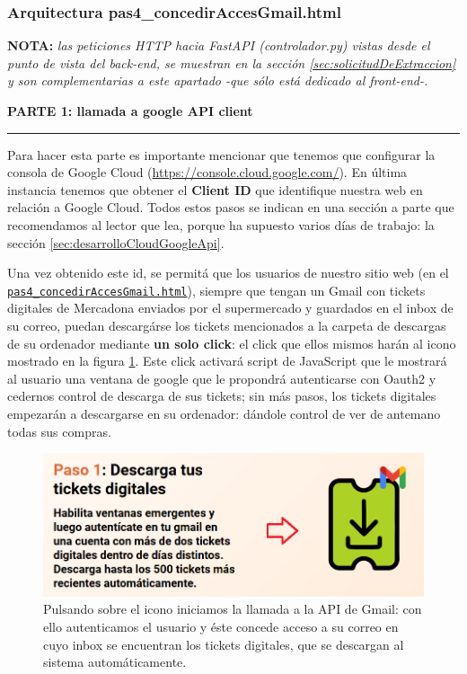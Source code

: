 \documentclass[a4paper,12pt]{report}
\begin{document}
	
	\subsubsection{Arquitectura pas4\_concedirAccesGmail.html}
	\label{sec:pas4googleAPIclient}
	
	
	\textbf{NOTA:} \textit{las peticiones HTTP hacia FastAPI (controlador.py) vistas desde el punto de vista del back-end, se muestran en la sección \ref{sec:solicitudDeExtraccion} y son complementarias a este apartado -que sólo está dedicado al front-end-.}
	
	
	
		
	\noindent \textbf{PARTE 1: llamada a google API client}
	\hrule
	\vspace{.5em}
	
	Para hacer esta parte es importante mencionar que tenemos que configurar la consola de Google Cloud (\href{https://console.cloud.google.com/}{https://console.cloud.google.com/}). En última instancia tenemos que obtener el \textbf{Client ID} que identifique nuestra web en relación a Google Cloud. Todos estos pasos se indican en una sección a parte que recomendamos al lector que lea, porque ha supuesto varios días de trabajo: la sección \ref{sec:desarrolloCloudGoogleApi}.
	
	Una vez obtenido este id, se permitá que los usuarios de nuestro sitio web (en el \href{https://github.com/blackcub3s/mercApp/blob/main/APP%20WEB/__frontend__produccio__/app/pas4_concedirAccesGmail.html}{\texttt{pas4\_concedirAccesGmail.html}}), siempre que tengan un Gmail con tickets digitales de Mercadona enviados por el supermercado y guardados en el inbox de su correo, puedan descargárse los tickets mencionados a la carpeta de descargas de su ordenador mediante \textbf{un solo click}: el click que ellos mismos harán al icono mostrado en la figura \ref{fig:pujarticketspas4}. Este click activará script de JavaScript que le mostrará al usuario una ventana de google que le propondrá autenticarse con Oauth2 y cedernos control de descarga de sus tickets; sin más pasos, los tickets digitales empezarán a descargarse en su ordenador: dándole control de ver de antemano todas sus compras.
	
	
	\begin{figure}[H]
		\centering
		\caption{Pulsando sobre el icono iniciamos la llamada a la API de Gmail: con ello autenticamos el usuario y éste concede acceso a su correo en cuyo inbox se encuentran los tickets digitales, que se descargan al sistema automáticamente.}
		\includegraphics[width=1\linewidth]{img/pujarTicketsPas4}

		\label{fig:pujarticketspas4}
	\end{figure}
	
\end{document}
